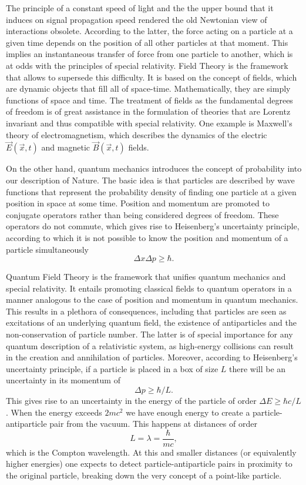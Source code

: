 The principle of a constant speed of light and the the upper bound that it induces on signal propagation speed rendered the old Newtonian view of interactions obsolete. According to the latter, the force acting on a particle at a given time depends on the position of all other particles at that moment. This implies an instantaneous transfer of force from one particle to another, which is at odds with the principles of special relativity. Field Theory is the framework that allows to supersede this difficulty. It is based on the concept of fields, which are dynamic objects that fill all of space-time. Mathematically, they are simply functions of space and time. The treatment of fields as the fundamental degrees of freedom is of great assistance in the formulation  of theories that are Lorentz invariant and thus compatible with special relativity. One example is Maxwell's theory of electromagnetism, which describes the dynamics of the electric $\vec{E}(\vec{x},t)$ and magnetic $\vec{B}(\vec{x},t)$ fields.

On the other hand, quantum mechanics introduces the concept of probability into our description of Nature. The basic idea is that particles are described by wave functions that represent the probability density of finding one particle at a given position in space at some time. Position and momentum are promoted to conjugate operators rather than being considered degrees of freedom. These operators do not commute, which gives rise to Heisenberg's uncertainty principle, according to which it is not possible to know the position and momentum of a particle simultaneously
\begin{equation*}
\Delta x\Delta p\geq\hbar.
\end{equation*} 

Quantum Field Theory is the framework that unifies quantum mechanics and special relativity. It entails promoting classical fields to quantum operators in a manner analogous to the case of position and momentum in quantum mechanics. This results in a plethora of consequences, including that particles are seen as excitations of an underlying quantum field, the existence of antiparticles and the non-conservation of particle number. The latter is of special importance for any quantum description of a relativistic system, as high-energy collisions can result in the creation and annihilation of  particles. Moreover, according to Heisenberg's uncertainty principle, if a particle is placed in a box of size $L$ there will be an uncertainty in its momentum of
\begin{equation*}
\Delta p\geq\hbar/L.
\end{equation*}
This gives rise to an uncertainty in the energy of the particle of order $\Delta E\geq\hbar c/L$. When the energy exceeds $2mc^2$ we have enough energy to create a particle-antiparticle pair from the vacuum. This happens at distances of order 
\begin{equation*}
L=\lambda=\frac{\hbar}{mc},
\end{equation*}
which is the Compton wavelength. At this and smaller distances (or equivalently higher energies) one expects to detect particle-antiparticle pairs in proximity to the original particle, breaking down the very concept of a point-like particle. 

